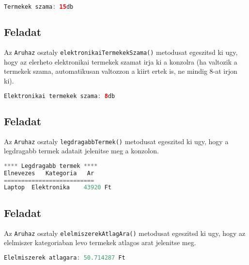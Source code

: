 \documentclass{article}
\begin{document}
\begin{lstlisting}[language=Java, caption=Pelda Aruhaz.termekekSzama() kimenet]
Termekek szama: 15db
\end{lstlisting}

\subsection{Feladat}

Az \lstinline{Aruhaz} osztaly \lstinline{elektronikaiTermekekSzama()} metodusat egeszitsd ki ugy, hogy az elerheto elektronikai termekek szamat irja ki a konzolra (ha valtozik a termekek szama, automatikusan valtozzon a kiirt ertek is, ne mindig 8-at irjon ki).

\begin{lstlisting}[language=Java, caption=Pelda Aruhaz.elektronikaiTermekekSzama() kimenet]
Elektronikai termekek szama: 8db
\end{lstlisting}

\subsection{Feladat}

Az \lstinline{Aruhaz} osztaly \lstinline{legdragabbTermek()} metodusat egeszitsd ki ugy, hogy a legdragabb termek adatait jelenitse meg a konzolon.

\begin{lstlisting}[language=Java, caption=Pelda Aruhaz.legdragabbTermek() kimenet]
**** Legdragabb termek ****
Elnevezes   Kategoria   Ar
==========================
Laptop  Elektronika    43920 Ft
\end{lstlisting}

\subsection{Feladat}

Az \lstinline{Aruhaz} osztaly \lstinline{elelmiszerekAtlagAra()} metodusat egeszitsd ki ugy, hogy az elelmiszer kategoriaban levo termekek atlagos arat jelenitse meg.

\begin{lstlisting}[language=Java, caption=Pelda Aruhaz.legdragabbTermek() kimenet]
Elelmiszerek atlagara: 50.714287 Ft
\end{lstlisting}
\end{document}
